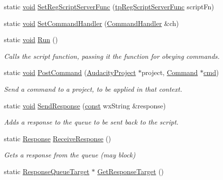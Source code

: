 \begin{DoxyCompactItemize}
\item 
static \hyperlink{sound_8c_ae35f5844602719cf66324f4de2a658b3}{void} \hyperlink{class_script_command_relay_adf1e2bdda1432acdb3d673b1485365f3}{Set\+Reg\+Script\+Server\+Func} (\hyperlink{_script_command_relay_8h_a7811294d61067ab0506c97b6d70b4019}{tp\+Reg\+Script\+Server\+Func} script\+Fn)
\item 
static \hyperlink{sound_8c_ae35f5844602719cf66324f4de2a658b3}{void} \hyperlink{class_script_command_relay_a77769d8835271612606f81f7a3a26b72}{Set\+Command\+Handler} (\hyperlink{class_command_handler}{Command\+Handler} \&ch)
\item 
static \hyperlink{sound_8c_ae35f5844602719cf66324f4de2a658b3}{void} \hyperlink{class_script_command_relay_a619cdbc2b15a5d255ed3c3874019a144}{Run} ()
\begin{DoxyCompactList}\small\item\em Calls the script function, passing it the function for obeying commands. \end{DoxyCompactList}\item 
static \hyperlink{sound_8c_ae35f5844602719cf66324f4de2a658b3}{void} \hyperlink{class_script_command_relay_a72ea2b20ea4c5fae3fe5f995489ef394}{Post\+Command} (\hyperlink{class_audacity_project}{Audacity\+Project} $\ast$project, \hyperlink{class_command}{Command} $\ast$\hyperlink{sndfile__play_8m_adfc5ba7e22f5e4a6221c12a70503bef3}{cmd})
\begin{DoxyCompactList}\small\item\em Send a command to a project, to be applied in that context. \end{DoxyCompactList}\item 
static \hyperlink{sound_8c_ae35f5844602719cf66324f4de2a658b3}{void} \hyperlink{class_script_command_relay_a1fb16bb7017e984da0936123f83b0c06}{Send\+Response} (\hyperlink{getopt1_8c_a2c212835823e3c54a8ab6d95c652660e}{const} wx\+String \&response)
\begin{DoxyCompactList}\small\item\em Adds a response to the queue to be sent back to the script. \end{DoxyCompactList}\item 
static \hyperlink{class_response}{Response} \hyperlink{class_script_command_relay_af77463a322cc508fcf23cf3c7c6eda0d}{Receive\+Response} ()
\begin{DoxyCompactList}\small\item\em Gets a response from the queue (may block) \end{DoxyCompactList}\item 
static \hyperlink{class_response_queue_target}{Response\+Queue\+Target} $\ast$ \hyperlink{class_script_command_relay_a83ddfa212a7dbed2bb84fad1dea26bd5}{Get\+Response\+Target} ()
\end{DoxyCompactItemize}


